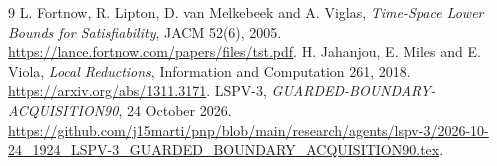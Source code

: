 \documentclass[11pt]{article}
\begin{document}
\begin{thebibliography}{9}
 L. Fortnow, R. Lipton, D. van Melkebeek and A. Viglas, \emph{Time-Space Lower Bounds for Satisfiability}, JACM 52(6), 2005. \url{https://lance.fortnow.com/papers/files/tst.pdf}.
 H. Jahanjou, E. Miles and E. Viola, \emph{Local Reductions}, Information and Computation 261, 2018. \url{https://arxiv.org/abs/1311.3171}.
 LSPV-3, \emph{GUARDED-BOUNDARY-ACQUISITION90}, 24 October 2026. \url{https://github.com/j15marti/pnp/blob/main/research/agents/lspv-3/2026-10-24_1924_LSPV-3_GUARDED_BOUNDARY_ACQUISITION90.tex}.
\end{thebibliography}
\end{document}
